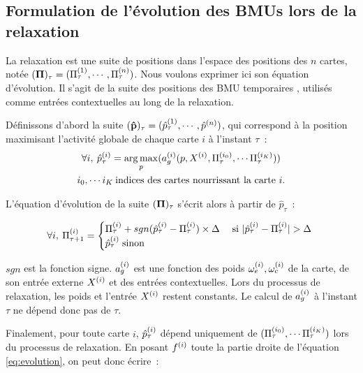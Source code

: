 \documentclass[../main]{subfiles}
\begin{document}
\subsection{Formulation de l'évolution des BMUs lors de la relaxation}\label{sec:formulation_suite}

La relaxation est une suite de positions dans l'espace des positions des $n$ cartes, notée $(\mathbf{\Pi})_\tau = (\Pi^{({1})}_\tau,\cdots,\Pi^{({n})}_\tau)$. Nous voulons exprimer ici son équation d'évolution. Il s'agit de la suite des positions des \og BMU temporaires \fg{}, utilisés comme entrées contextuelles au long de la relaxation.

Définissons d'abord la suite $(\mathbf{\hat{p}})_\tau = (\hat{p}^{({1})}_\tau, \cdots, \hat{p}^{({n})})$, qui correspond à la position maximisant l'activité globale de chaque carte $i$ à l'instant $\tau$~:
\begin{equation}
\begin{gathered}
\forall i, \: \hat{p}^{({i})}_{\tau} = \operatorname*{arg\,max}\limits_p(a_g^{({i})}(p, X^{({i})}, \Pi^{({i_0})}_\tau, \cdots \Pi^{({i_K})}_\tau))\\
 i_0, \cdots i_K \: \text{indices des cartes nourrissant la carte $i$}.
\end{gathered}
\label{eq:pstar}
\end{equation}

L'équation d'évolution de la suite $(\mathbf{\Pi})_\tau$ s'écrit alors à partir de $\hat{p}_\tau$~:

\begin{equation}
\forall i, \: \Pi^{({i})}_{\tau+1} = 
\begin{cases}
\Pi^{({i})}_{\tau} + sgn(\hat{p}^{({i})}_{\tau} - \Pi^{({i})}_{\tau}) \times \Delta \; & \text{si $\lvert \hat{p}^{({i})}_{\tau} - \Pi^{({i})}_{\tau}\rvert > \Delta$ } \\
\hat{p}^{({i})}_{\tau} \; \text{sinon}	
\end{cases}
\label{eq:evolution}
\end{equation}

$sgn$ est la fonction signe.
$a_g^{({i})}$ est une fonction des poids $\omega_{e}^{({i})}, \omega_{c}^{({i})}$ de la carte, de son entrée externe $X^{({i})}$ et des entrées contextuelles.
Lors du processus de relaxation, les poids et l'entrée $X^{({i})}$ restent constants. 
Le calcul de $a_g^{({i})}$ à l'instant $\tau$ ne dépend donc pas de $\tau$.

Finalement, pour toute carte $i$, $\hat{p}^{({i})}_{\tau}$ dépend uniquement de $(\Pi^{({i_0})}_\tau, \cdots \Pi^{({i_K})}_\tau)$ lors du processus de relaxation.
En posant $f^{({i})}$ toute la partie droite de l'équation \ref{eq:evolution}, on peut donc écrire~:
\end{document}
